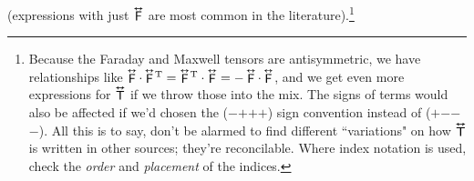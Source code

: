 \documentclass[12pt]{article}
\newcommand{\tightoverset}[2]{%
  \mathop{#2}\limits^{\vbox to -.5ex{\kern-0.75ex\hbox{$#1$}\vss}}}
\newcommand{\inlinedy}[1]{\tightoverset{\text{\tiny$\bm\leftrightarrow$}}{#1}}
\newcommand{\fnoverset}[2]{%
  \mathop{#2}\limits^{\vbox to -.5ex{\kern-0.85ex\hbox{$#1$}\vss}}}
\newcommand{\footnotedy}[1]{\fnoverset{\text{\tiny$\bm\leftrightarrow$}}{#1}}
\begin{document}
(expressions with just $\inlinedy{\mathsf{F}}$ are most common in the literature).\footnote{Because the Faraday and Maxwell tensors are antisymmetric, we have relationships like $\footnotedy{\mathsf{F}} \cdot \footnotedy{\mathsf{F}} \mkern-2mu^\mathrm{T} = \footnotedy{\mathsf{F}} \mkern-2mu^\mathrm{T} \cdot \footnotedy{\mathsf{F}} = - \footnotedy{\mathsf{F}} \cdot \footnotedy{\mathsf{F}}$, and we get even more expressions for $\footnotedy{\mathsf{T}}$ if we throw those into the mix. The signs of terms would also be affected if we'd chosen the ($-$$+$$+$$+$) sign convention instead of ($+$$-$$-$$-$). All this is to say, don't be alarmed to find different ``variations" on how $\footnotedy{\mathsf{T}}$ is written in other sources; they're reconcilable. Where index notation is used, check the \emph{order} and \emph{placement} of the indices.}
\end{document}
